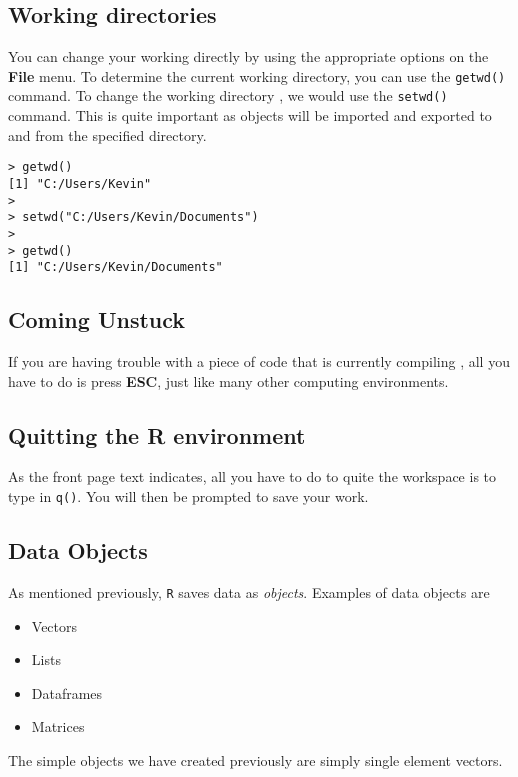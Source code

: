 \documentclass[a4paper,12pt]{article}
\begin{document}
\subsection{Working directories} %
You can change your working directly by using the appropriate options on the \textbf{File} menu.
To determine the current working directory, you can use the \texttt{getwd()} command. 
To change the working directory , we would use the \texttt{setwd()} command. 
This is quite important as objects will be imported and exported to and from the specified directory.
\begin{framed}
\begin{verbatim}
> getwd() 
[1] "C:/Users/Kevin" 
> 
> setwd("C:/Users/Kevin/Documents") 
> 
> getwd() 
[1] "C:/Users/Kevin/Documents"
\end{verbatim}
\end{framed}




\subsection{Coming Unstuck} %
If you are having trouble with a piece of code that is currently compiling ,  all you have to do is press \textbf{ESC}, just like many other computing environments.
\subsection{Quitting the R environment} %

As the front page text indicates, all you have to do to quite the workspace is to type in \texttt{q()}. You will then be prompted to save your work.
\subsection{Data Objects}
As mentioned previously, \texttt{R} saves data as \textit{objects}. Examples of data objects are
\begin{itemize}
\item Vectors
\item Lists
\item Dataframes
\item Matrices
\end{itemize}
The simple objects we have created previously are simply single element vectors.
\end{document}
